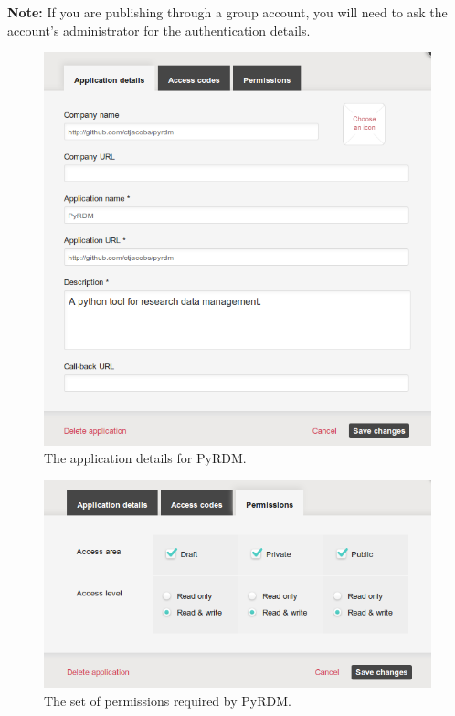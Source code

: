 \documentclass[a4paper,11pt]{report}
\begin{document}
\textbf{Note:} If you are publishing through a group account, you will need to ask the account's administrator for the authentication details.

\begin{figure}
  \centering
  \includegraphics[width=1\columnwidth]{images/application_details.png}
  \caption{The application details for PyRDM.}
  \label{fig:application_details}
\end{figure}

\begin{figure}
  \centering
  \includegraphics[width=1\columnwidth]{images/permissions.png}
  \caption{The set of permissions required by PyRDM.}
  \label{fig:permissions}
\end{figure}
\end{document}
